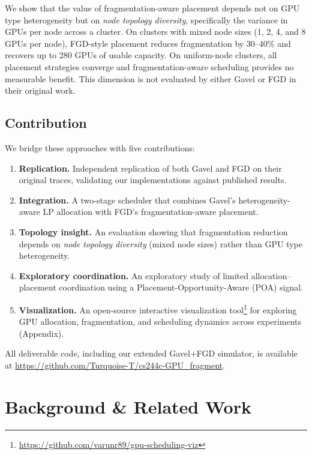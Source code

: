 \documentclass[conference]{IEEEtran}
\begin{document}
We show that the value of fragmentation-aware placement depends not on GPU type heterogeneity but on \textit{node topology diversity}, specifically the variance in GPUs per node across a cluster.
On clusters with mixed node sizes (1, 2, 4, and 8 GPUs per node), FGD-style placement reduces fragmentation by 30--40\% and recovers up to 280 GPUs of usable capacity.
On uniform-node clusters, all placement strategies converge and fragmentation-aware scheduling provides no measurable benefit.
This dimension is not evaluated by either Gavel or FGD in their original work.

\subsection{Contribution}
We bridge these approaches with five contributions:
\begin{enumerate}

\item \textbf{Replication.} Independent replication of both Gavel and FGD on their original traces, validating our implementations against published results.

\item \textbf{Integration.} A two-stage scheduler that combines Gavel's heterogeneity-aware LP allocation with FGD's fragmentation-aware placement.

\item \textbf{Topology insight.} An evaluation showing that fragmentation reduction depends on \textit{node topology diversity} (mixed node sizes) rather than GPU type heterogeneity.

\item \textbf{Exploratory coordination.} An exploratory study of limited allocation--placement coordination using a Placement-Opportunity-Aware (POA) signal.

\item \textbf{Visualization.} An open-source interactive visualization tool\footnote{\url{https://github.com/varunr89/gpu-scheduling-viz}} for exploring GPU allocation, fragmentation, and scheduling dynamics across experiments (Appendix).

\end{enumerate}
All deliverable code, including our extended Gavel+FGD simulator, is available at \url{https://github.com/Turquoise-T/cs244c-GPU_fragment}.

\section{Background \& Related Work}
\end{document}
